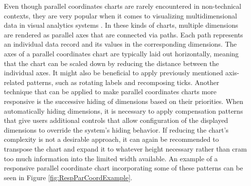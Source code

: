Even though parallel coordinates charts are rarely encountered in non-technical contexts, they are very popular when it comes to visualizing multidimensional data in visual analytics systems \parencite{HighD}. In these kinds of charts, multiple dimensions are rendered as parallel axes that are connected via paths. Each path represents an individual data record and its values in the corresponding dimensions. The axes of a parallel coordinates chart are typically laid out horizontally, meaning that the chart can be scaled down by reducing the distance between the individual axes. It might also be beneficial to apply previously mentioned axis-related patterns, such as rotating labels and recomposing ticks. Another technique that can be applied to make parallel coordinates charts more responsive is the successive hiding of dimensions based on their priorities. When automatically hiding dimensions, it is necessary to apply compensation patterns that give users additional controls that allow configuration of the displayed dimensions to override the system's hiding behavior. If reducing the chart's complexity is not a desirable approach, it can again be recommended to transpose the chart and expand it to whatever height necessary rather than cram too much information into the limited width available. An example of a responsive parallel coordinate chart incorporating some of these patterns can be seen in Figure \ref{fig:RespParCoordExample}.


